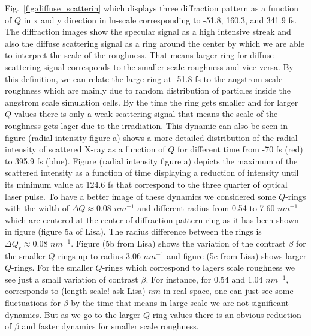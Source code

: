 \documentclass[preprint, 12pt]{elsarticle}
\begin{document}
{\color{blue}
%
Fig.~\ref{fig:diffuse_scatterin}
which displays three diffraction pattern as a function of $Q$ in x and y
direction in ln-scale corresponding to -51.8, 160.3, and 341.9 fs. The
diffraction images show the specular signal as a high intensive streak and also
the diffuse scattering signal as a ring around the center by which we are able
to interpret the scale of the roughness. That means larger ring for diffuse
scattering signal corresponds to the smaller scale roughness and vice versa. By
this definition, we can relate the large ring at -51.8 fs to the angstrom scale
roughness which are mainly due to random distribution of particles inside the
angstrom scale simulation cells. By the time the ring gets smaller and for
larger $Q$-values there is only a weak scattering signal that means the scale of
the roughness gets lager due to the irradiation. This dynamic can also be seen
in figure (radial intensity figure a) shows a more detailed distribution of the
radial intensity of scattered X-ray as a function of $Q$ for different time from
-70 fs (red) to 395.9 fs (blue). Figure (radial intensity figure a) depicts the
maximum of the scattered intensity as a function of time displaying a reduction
of intensity until its minimum value at 124.6 fs that correspond to the three
quarter of optical laser pulse.
To have a better image of these dynamics we considered some $Q$-rings with the
width of $\Delta Q \approx 0.08$ $nm^{-1}$ and different radius from 0.54 to
7.60 $nm^{-1}$ which are centered at the center of diffraction pattern ring as
it has been shown in figure (figure 5a of Lisa). The radius difference between
the rings is $\Delta Q_r \approx 0.08$ $nm^{-1}$. Figure (5b from Lisa) shows
the variation of the contrast $\beta$ for the smaller $Q$-rings up to radius
3.06 $nm^{-1}$ and figure (5c from Lisa) shows larger $Q$-rings. For the smaller
$Q$-rings which correspond to lagers scale roughness we see just a small
variation of contrast $\beta$. For instance, for 0.54 and 1.04 $nm^{-1}$,
corresponds to (length scale! ask Lisa) $nm$ in real space, one can just see
some fluctuations for $\beta$ by the time that means in large scale we are not
significant dynamics. But as we go to the larger $Q$-ring values there is an
obvious reduction of $\beta$ and faster dynamics for smaller scale roughness.

}
\end{document}
